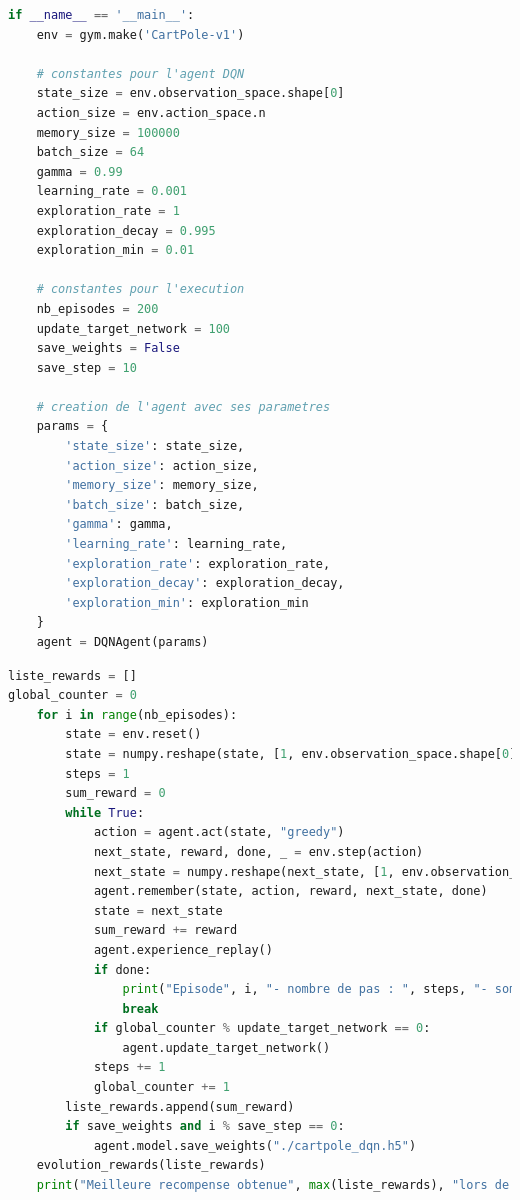 \documentclass[10pt,a4paper]{article}
\begin{document}
\begin{lstlisting}[language=Python, caption=Paramétrage de l'agent DQN]
if __name__ == '__main__':
    env = gym.make('CartPole-v1')

    # constantes pour l'agent DQN
    state_size = env.observation_space.shape[0]
    action_size = env.action_space.n
    memory_size = 100000
    batch_size = 64
    gamma = 0.99
    learning_rate = 0.001
    exploration_rate = 1
    exploration_decay = 0.995
    exploration_min = 0.01

    # constantes pour l'execution
    nb_episodes = 200
    update_target_network = 100
    save_weights = False
    save_step = 10

    # creation de l'agent avec ses parametres
    params = {
        'state_size': state_size,
        'action_size': action_size,
        'memory_size': memory_size,
        'batch_size': batch_size,
        'gamma': gamma,
        'learning_rate': learning_rate,
        'exploration_rate': exploration_rate,
        'exploration_decay': exploration_decay,
        'exploration_min': exploration_min
    }
    agent = DQNAgent(params)
\end{lstlisting}

\begin{lstlisting}[language=Python, caption=Programme principal de l'agent DQN]
liste_rewards = []
global_counter = 0
    for i in range(nb_episodes):
        state = env.reset()
        state = numpy.reshape(state, [1, env.observation_space.shape[0]])
        steps = 1
        sum_reward = 0
        while True:
            action = agent.act(state, "greedy")
            next_state, reward, done, _ = env.step(action)
            next_state = numpy.reshape(next_state, [1, env.observation_space.shape[0]])
            agent.remember(state, action, reward, next_state, done)
            state = next_state
            sum_reward += reward
            agent.experience_replay()
            if done:
                print("Episode", i, "- nombre de pas : ", steps, "- somme recompenses", sum_reward)
                break
            if global_counter % update_target_network == 0:
                agent.update_target_network()
            steps += 1
            global_counter += 1
        liste_rewards.append(sum_reward)
        if save_weights and i % save_step == 0:
            agent.model.save_weights("./cartpole_dqn.h5")
    evolution_rewards(liste_rewards)
    print("Meilleure recompense obtenue", max(liste_rewards), "lors de l'episode", liste_rewards.index(max(liste_rewards)))
\end{lstlisting}
\end{document}
